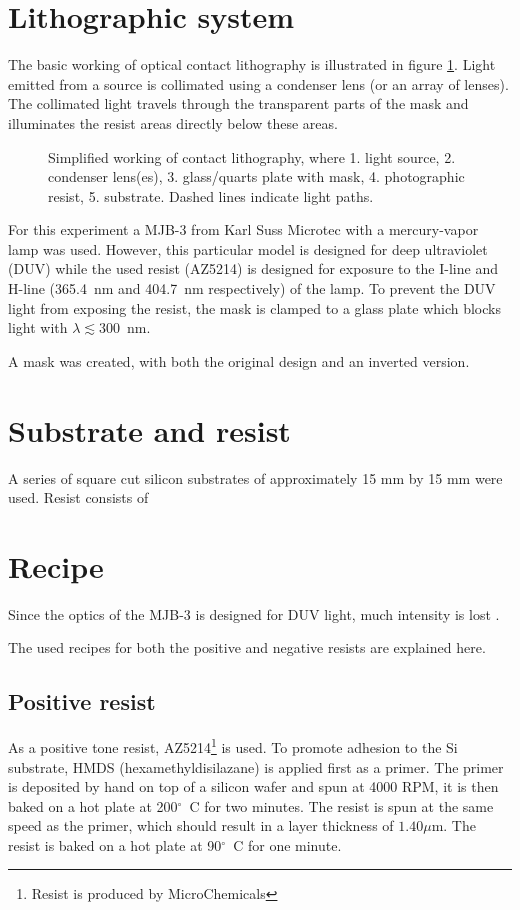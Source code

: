 \section*{Lithographic system}
The basic working of optical contact lithography is illustrated in figure \ref{fig:contact-litho}. Light emitted from a source is collimated using a condenser lens (or an array of lenses). The collimated light travels through the transparent parts of the mask and illuminates the resist areas directly below these areas. 
\begin{figure}[H]
	\centering
	\resizebox{0.7\linewidth}{!}{}
	\caption{Simplified working of contact lithography, where 1. light source, 2. condenser lens(es), 3. glass/quarts plate with mask, 4. photographic resist, 5. substrate. Dashed lines indicate light paths.}
	\label{fig:contact-litho}
\end{figure} For this experiment a MJB-3 from Karl Suss Microtec with a mercury-vapor lamp was used. However, this particular model is designed for deep ultraviolet (DUV) while the used resist (AZ5214) is designed for exposure to the I-line and H-line (365.4~nm and 404.7~nm respectively) of the lamp. To prevent the DUV light from exposing the resist, the mask is clamped to a glass plate which blocks light with $\lambda \lesssim 300$~nm. 

A mask was created, with both the original design and an inverted version.  

\section*{Substrate and resist}
A series of square cut silicon substrates of approximately 15 mm by 15 mm were used. Resist consists of 

\section*{Recipe}
Since the optics of the MJB-3 is designed for DUV light, much intensity is lost .

The used recipes for both the positive and negative resists are explained here.
\subsection*{Positive resist}
As a positive tone resist, AZ5214\footnote{Resist is produced by MicroChemicals} is used. To promote adhesion to the Si substrate, HMDS (hexamethyldisilazane) is applied first as a primer. The primer is deposited by hand on top of a silicon wafer and spun at 4000 RPM, it is then baked on a hot plate at 200$^{\circ}$~C for two minutes. The resist is spun at the same speed as the primer, which should result in a layer thickness of $1.40 \mu$m. The resist is baked on a hot plate at 90$^{\circ}$~C for one minute.


